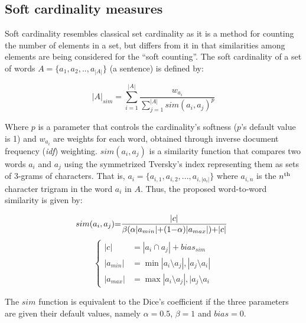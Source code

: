 \subsection{Soft cardinality measures}
\label{sec:softcard}

Soft cardinality resembles classical set cardinality as it is a method
for counting the number of elements in a set, but differs from it
in that similarities among elements are being considered for
the ``soft counting''. 
The soft cardinality of a set of words 
$A=\{a_{1},a_{2},..,a_{|A|}\}$  (a sentence) is defined by:

\begin{equation}
|A|_{sim}=\sum_{i=1}^{|A|}\frac{w_{a_{i}}}{\sum_{j=1}^{|A|}sim(a_{i},a_{j})^{p}}\label{eq:soft_card}
\end{equation}

\noindent
Where $p$ is a parameter that controls the cardinality's softness ($p$'s default value is 1)
and $w_{a_{i}}$ are weights for each word,
obtained through inverse document frequency (\emph{idf}) weighting.
$sim(a_{i},a_{j})$ is a similarity function that compares two words $a_{i}$ and $a_{j}$
using the symmetrized Tversky's index \cite{tversky_features_1977,jimenez_softcardinality_core:_2013}
representing them as sets of 3-grams of characters. 
That is, $a_{i}=\{a_{i,1},a_{i,2},...,a_{i,|a_{i}|}\}$
where $a_{i,n}$ is the $n^{\rm th}$ character trigram in the word $a_{i}$ in $A$. 
Thus, the proposed word-to-word similarity is given by:

\begin{equation}
\hspace*{-.5em}sim(a_{i},a_{j}) {=} \frac{|c|}{\beta(\alpha|a_{min}|{+}(1{-}\alpha)|a_{max}|){+}|c|}\label{eq:symm_tversky}
\end{equation}
\vspace*{-2ex}\begin{equation*}
\begin{cases}
|c| &= |a_{i}\cap a_{j}|+bias_{sim}\\
|a_{min}| &= \min{|a_{i}\setminus a_{j}|,|a_{j}\setminus a_{i}|}\\
|a_{max}| &= \max{|a_{i}\setminus a_{j}|,|a_{j}\setminus a_{i}}
\end{cases}
\end{equation*}

The $sim$ function is equivalent to the Dice's coefficient
if the three parameters are given their default values, namely
$\alpha=0.5$, $\beta=1$ and $bias=0$.

